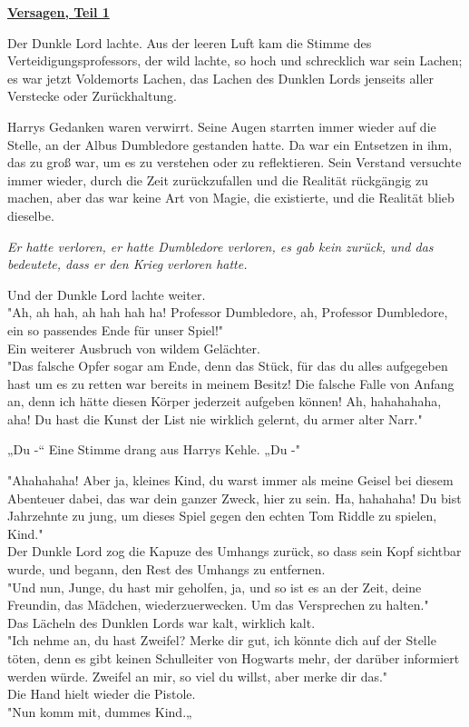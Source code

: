 

\hypertarget{versagen-teil-1}{%

\textbf{\uline{Versagen, Teil 1}}

\hfill\break Der Dunkle Lord lachte. Aus der leeren Luft kam die Stimme des Verteidigungsprofessors, der wild lachte, so hoch und schrecklich war sein Lachen; es war jetzt Voldemorts Lachen, das Lachen des Dunklen Lords jenseits aller Verstecke oder Zurückhaltung.

Harrys Gedanken waren verwirrt. Seine Augen starrten immer wieder auf die Stelle, an der Albus Dumbledore gestanden hatte. Da war ein Entsetzen in ihm, das zu groß war, um es zu verstehen oder zu reflektieren. Sein Verstand versuchte immer wieder, durch die Zeit zurückzufallen und die Realität rückgängig zu machen, aber das war keine Art von Magie, die existierte, und die Realität blieb dieselbe.

\emph{Er hatte verloren, er hatte Dumbledore verloren, es gab kein zurück, und das bedeutete, dass er den Krieg verloren hatte.}

Und der Dunkle Lord lachte weiter.\\ "Ah, ah hah, ah hah hah ha! Professor Dumbledore, ah, Professor Dumbledore, ein so passendes Ende für unser Spiel!"\\ Ein weiterer Ausbruch von wildem Gelächter.\\ "Das falsche Opfer sogar am Ende, denn das Stück, für das du alles aufgegeben hast um es zu retten war bereits in meinem Besitz! Die falsche Falle von Anfang an, denn ich hätte diesen Körper jederzeit aufgeben können! Ah, hahahahaha, aha! Du hast die Kunst der List nie wirklich gelernt, du armer alter Narr."

„Du -“ Eine Stimme drang aus Harrys Kehle. „Du -"

"Ahahahaha! Aber ja, kleines Kind, du warst immer als meine Geisel bei diesem Abenteuer dabei, das war dein ganzer Zweck, hier zu sein. Ha, hahahaha! Du bist Jahrzehnte zu jung, um dieses Spiel gegen den echten Tom Riddle zu spielen, Kind."\\ Der Dunkle Lord zog die Kapuze des Umhangs zurück, so dass sein Kopf sichtbar wurde, und begann, den Rest des Umhangs zu entfernen.\\ "Und nun, Junge, du hast mir geholfen, ja, und so ist es an der Zeit, deine Freundin, das Mädchen, wiederzuerwecken. Um das Versprechen zu halten."\\ Das Lächeln des Dunklen Lords war kalt, wirklich kalt.\\ "Ich nehme an, du hast Zweifel? Merke dir gut, ich könnte dich auf der Stelle töten, denn es gibt keinen Schulleiter von Hogwarts mehr, der darüber informiert werden würde. Zweifel an mir, so viel du willst, aber merke dir das."\\ Die Hand hielt wieder die Pistole.\\ "Nun komm mit, dummes Kind.„

}
